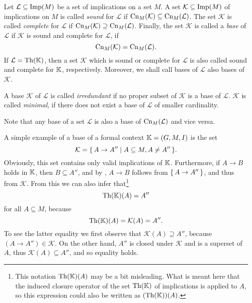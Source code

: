 \begin{Definition}
  \label{def:sound-complete-base}
  Let $\mathcal{L} \subseteq \operatorname{Imp}(M)$ be a set of implications on a set $M$.  A set
  $\mathcal{K} \subseteq \operatorname{Imp}(M)$ of implications on $M$ is called \emph{sound} for
  $\mathcal{L}$ if $\operatorname{Cn}_M(\mathcal{K}) \subseteq \operatorname{Cn}_M(\mathcal{L})$.  The set
  $\mathcal{K}$ is called \emph{complete} for $\mathcal{L}$ if $\operatorname{Cn}_M(\mathcal{K})
  \supseteq \operatorname{Cn}_M(\mathcal{L})$.  Finally, the set $\mathcal{K}$ is called a
  \emph{base} of $\mathcal{L}$ if $\mathcal{K}$ is sound and complete for $\mathcal{L}$,
  \ie if
  \begin{equation}
    \label{eq:8}
    \operatorname{Cn}_M(\mathcal{K}) = \operatorname{Cn}_M(\mathcal{L}).
  \end{equation}
  If $\mathcal{L} = \operatorname{Th}({\mathbb{K}})$, then a set $\mathcal{K}$ which is sound or complete for
  $\mathcal{L}$ is also called sound and complete for ${\mathbb{K}}$, respectively.  Moreover,
  we shall call bases of $\mathcal{L}$ also bases of $\mathcal{K}$.

  A base $\mathcal{K}$ of $\mathcal{L}$ is called \emph{irredundant} if no proper subset
  of $\mathcal{K}$ is a base of $\mathcal{L}$.  $\mathcal{K}$ is called \emph{minimal}, if
  there does not exist a base of $\mathcal{L}$ of smaller cardinality.
\end{Definition}

Note that any base of a set $\mathcal{L}$ is also a base of $\operatorname{Cn}_M(\mathcal{L})$ and vice
versa.

A simple example of a base of a formal context ${\mathbb{K}} = (G, M, I)$ is the set
\begin{equation}
  \label{eq:10}
  \mathcal{K} = {\{\, A \to A'' \mid A \subseteq M, A \neq A'' \,\}}.
\end{equation}
Obviously, this set contains only valid implications of ${\mathbb{K}}$.  Furthermore, if $A \to
B$ holds in ${\mathbb{K}}$, then $B \subseteq A''$, and by
, $A \to
B$ follows from ${\{\, A \to A'' \,\}}$, and thus from $\mathcal{K}$.  From this we can also
infer that\footnote{This notation $\operatorname{Th}({\mathbb{K}})(A)$ may be a bit misleading.  What is meant
  here that the induced closure operator of the set $\operatorname{Th}({\mathbb{K}})$ of implications is
  applied to $A$, so this expression could also be written as $(\operatorname{Th}({\mathbb{K}}))(A)$.}
\begin{equation*}
  \operatorname{Th}({\mathbb{K}})(A) = A''
\end{equation*}
for all $A \subseteq M$, because
\begin{equation*}
  \operatorname{Th}({\mathbb{K}})(A) = \mathcal{K}(A) = A''.
\end{equation*}
To see the latter equality we first observe that $\mathcal{K}(A) \supseteq A''$, because
$(A \to A'') \in \mathcal{K}$.  On the other hand, $A''$ is closed under $\mathcal{K}$ and
is a superset of $A$, thus $\mathcal{K}(A) \subseteq A''$, and so equality holds.

